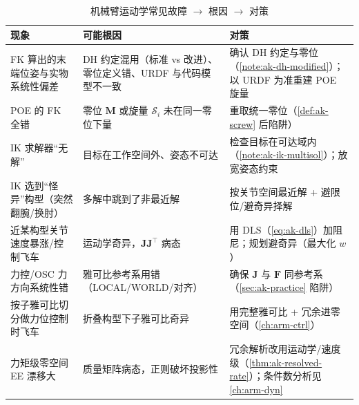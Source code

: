 \begin{table}[H]\centering\small
\caption{机械臂运动学常见故障 $\to$ 根因 $\to$ 对策}
\label{tab:ak-troubleshoot}
\begin{tabularx}{\linewidth}{p{} L L}
\toprule
现象 & 可能根因 & 对策 \\
\midrule
FK 算出的末端位姿与实物系统性偏差 & DH 约定混用（标准 vs 改进）、零位定义错、URDF 与代码模型不一致 & 确认 DH 约定与零位（\cref{note:ak-dh-modified}）；以 URDF 为准重建 POE 旋量 \\
POE 的 FK 全错 & 零位 $\mathbf{M}$ 或旋量 $\mathcal{S}_i$ 未在同一零位下量 & 重取统一零位（\cref{def:ak-screw} 后陷阱） \\
IK 求解器“无解” & 目标在工作空间外、姿态不可达 & 检查目标在可达域内（\cref{note:ak-ik-multisol}）；放宽姿态约束 \\
IK 选到“怪异”构型（突然翻腕/换肘） & 多解中跳到了非最近解 & 按关节空间最近解 + 避限位/避奇异择解 \\
近某构型关节速度暴涨/控制飞车 & 运动学奇异，$\mathbf{J}\mathbf{J}^\top$ 病态 & 用 DLS（\cref{eq:ak-dls}）加阻尼；规划避奇异（最大化 $w$） \\
力控/OSC 力方向系统性错 & 雅可比参考系用错（LOCAL/WORLD/对齐） & 确保 $\mathbf{J}$ 与 $\mathbf{F}$ 同参考系（\cref{sec:ak-practice} 陷阱） \\
按子雅可比切分做力位控制时飞车 & 折叠构型下子雅可比奇异 & 用完整雅可比 + 冗余进零空间（\cref{ch:arm-ctrl}） \\
力矩级零空间 EE 漂移大 & 质量矩阵病态，正则破坏投影性 & 冗余解析改用运动学/速度级（\cref{thm:ak-resolved-rate}）；条件数分析见 \cref{ch:arm-dyn} \\
\bottomrule
\end{tabularx}
\end{table}
